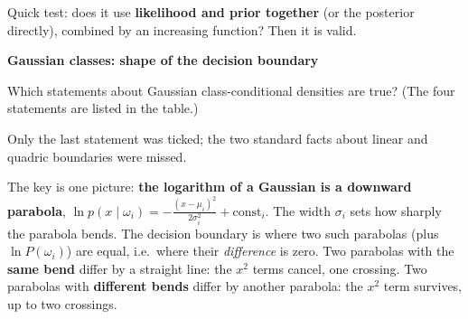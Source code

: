 \documentclass[11pt,a4paper]{article}
\newcommand{\keep}[1]{\par
  \ifdim\dimexpr\pagegoal-\pagetotal\relax<#1\relax\newpage\fi}
\newcommand{\sub}[1]{\keep{6cm}\medskip
  {\sffamily\bfseries\large\color{accent}#1}\par\smallskip}
\begin{document}
\begin{hook}
Quick test: does it use \textbf{likelihood and prior together} (or the posterior
directly), combined by an increasing function? Then it is valid.
\end{hook}

\sub{Gaussian classes: shape of the decision boundary}

\begin{question}
Which statements about Gaussian class-conditional densities are true? (The four
statements are listed in the table.)
\end{question}
\begin{yours}
Only the last statement was ticked; the two standard facts about linear and
quadric boundaries were missed.
\end{yours}

\begin{why}
The key is one picture: \textbf{the logarithm of a Gaussian is a downward
parabola}, $\ln p(x\mid\omega_i) = -\frac{(x-\mu_i)^2}{2\sigma_i^2} + \text{const}_i$.
The width $\sigma_i$ sets how sharply the parabola bends. The decision boundary
is where two such parabolas (plus $\ln P(\omega_i)$) are equal, i.e.\ where their
\emph{difference} is zero. Two parabolas with the \textbf{same bend} differ by a
straight line: the $x^2$ terms cancel, one crossing. Two parabolas with
\textbf{different bends} differ by another parabola: the $x^2$ term survives, up
to two crossings.
\end{why}
\end{document}
